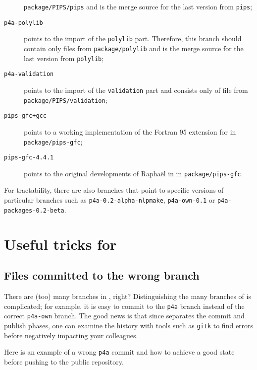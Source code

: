 \documentclass[a4paper]{article}
\begin{document}
\begin{description}
  \texttt{package/PIPS/pips} and is the merge source for
  the last version from \texttt{pips};
\item[\texttt{p4a-polylib}] points to the import of the \Apips \texttt{polylib}
  part. Therefore, this branch should contain only files from
  \texttt{package/polylib} and is the merge source for
  the last version from \texttt{polylib};
\item[\texttt{p4a-validation}] points to the import of the \Apips
  \texttt{validation} part and consists only of file from
  \texttt{package/PIPS/validation};
\item[\texttt{pips-gfc+gcc}] points to a working \Apipsgfc implementation
  of the Fortran 95 extension for \Apips in \texttt{package/pips-gfc};
\item[\texttt{pips-gfc-4.4.1}] points to the original developments of
  Raphaël in \Agcc in \texttt{package/pips-gfc}.
\end{description}

For tractability, there are also branches that point
to specific versions of particular branches such as
\texttt{p4a-0.2-alpha-nlpmake}, \texttt{p4a-own-0.1} or
\texttt{p4a-packages-0.2-beta}.


\section{Useful \protect\Agit tricks for \protect\Apfa}
\label{sec:some-agit-tricks}


\subsection{Files committed to the wrong branch}
\label{sec:you-have-comited}

There are (too) many branches in \Apfa, right? Distinguishing the many
branches of \Apfa is complicated; for example, it is easy
to commit to the \texttt{p4a} branch instead of the correct
\texttt{p4a-own} branch. The good news is that since \Agit separates
the commit and publish phases, one can examine the history
with tools such as \texttt{gitk} to find errors before negatively
impacting your colleagues.

Here is an example of a wrong \texttt{p4a} commit and how to achieve a
good state before pushing to the public repository.
\end{document}
